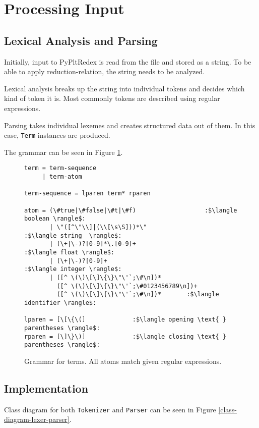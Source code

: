 \section{Processing Input}


\subsection{Lexical Analysis and Parsing}

Initially, input to PyPltRedex is read from the file and stored as a string. To be able to apply reduction-relation, the string needs to be analyzed. 

Lexical analysis breaks up the string into individual tokens and decides which kind of token it is. Most commonly tokens are described using regular expressions. 

Parsing takes individual lexemes and creates structured data out of them. In this case, \texttt{Term} instances are produced. 

The grammar can be seen in Figure \ref{tok-lex-grammar}.


\begin{figure}[h]
\begin{verbatim}
term = term-sequence 
     | term-atom

term-sequence = lparen term* rparen

atom = (\#true|\#false|\#t|\#f)					  :$\langle boolean \rangle$:
	   | \"([^\"\\]|(\\[\s\S]))*\"				   :$\langle string  \rangle$:
	   | (\+|\-)?[0-9]*\.[0-9]+					    :$\langle float \rangle$:
	   | (\+|\-)?[0-9]+							        :$\langle integer \rangle$:
	   | ([^ \(\)\[\]\{\}\"\'`;\#\n])*
	     ([^ \(\)\[\]\{\}\"\'`;\#0123456789\n])+ 
	     ([^ \(\)\[\]\{\}\"\'`;\#\n])*       :$\langle identifier \rangle$:

lparen = [\[\{\(]             :$\langle opening \text{ } parentheses \rangle$:
rparen = [\]\}\)]             :$\langle closing \text{ } parentheses \rangle$:
\end{verbatim} 
\caption{Grammar for terms. All atoms match given regular expressions.}
\label{tok-lex-grammar}
\end{figure}

\subsection{Implementation}
Class diagram for both \texttt{Tokenizer} and \texttt{Parser} can be seen in Figure \ref{class-diagram-lexer-parser}.

